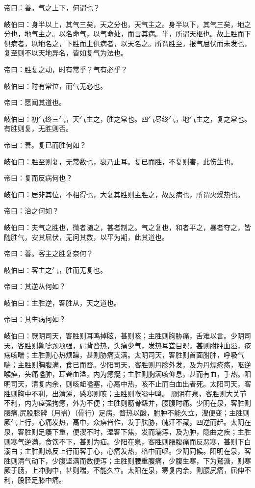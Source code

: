 \documentclass{article}%
\begin{document}
帝曰：善。气之上下，何谓也？

岐伯曰：身半以上，其气三矣，天之分也，天气主之。身半以下，其气三矣，地之分也，地气主之。以名命气，以气命处，而言其病。半，所谓天枢也。故上胜而下俱病者，以地名之，下胜而上俱病者，以天名之。所谓胜至，报气屈伏而未发也，复至则不以天地异名，皆如复气为法也。

帝曰：胜复之动，时有常乎？气有必乎？

岐伯曰：时有常位，而气无必也。

帝曰：愿闻其道也。

岐伯曰：初气终三气，天气主之，胜之常也。四气尽终气，地气主之，复之常也。有胜则复，无胜则否。

帝曰：善。复已而胜何如？

岐伯曰：胜至则复，无常数也，衰乃止耳。复已而胜，不复则害，此伤生也。

帝曰：复而反病何也？

岐伯曰：居非其位，不相得也，大复其胜则主胜之，故反病也，所谓火燥热也。

帝曰：治之何如？

岐伯曰：夫气之胜也，微者随之，甚者制之。气之复也，和者平之，暴者夺之，皆随胜气，安其屈伏，无问其数，以平为期，此其道也。

帝曰：善。客主之胜复奈何？

岐伯曰：客主之气，胜而无复也。

帝曰：其逆从何如？

岐伯曰：主胜逆，客胜从，天之道也。

帝曰：其生病何如？

岐伯曰：厥阴司天，客胜则耳鸣掉眩，甚则咳；主胜则胸胁痛，舌难以言。少阴司天，客胜则鼽嚏颈项强，肩背瞀热，头痛少气，发热耳聋目暝，甚则胕肿血溢，疮疡咳喘；主胜则心热烦躁，甚则胁痛支满。太阴司天，客胜则首面胕肿，呼吸气喘；主胜则胸腹满，食已而瞀。少阳司天，客胜则丹胗外发，及为丹熛疮疡，呕逆喉痹，头痛嗌肿，耳聋血溢，内为瘛瘲；主胜则胸满咳仰息，甚而有血，手热。阳明司天，清复内余，则咳衄嗌塞，心鬲中热，咳不止而白血出者死。太阳司天，客胜则胸中不利，出清涕，感寒则咳；主胜则喉嗌中鸣。 厥阴在泉，客胜则大关节不利，内为痉强拘瘛，外为不便；主胜则筋骨繇并，腰腹时痛。少阴在泉，客胜则腰痛,尻股膝髀（月耑）（骨行）足病，瞀热以酸，胕肿不能久立，溲便变；主胜则厥气上行，心痛发热，鬲中，众痹皆作，发于胠胁，魄汗不藏，四逆而起。太阴在泉，客胜则足痿下重，便溲不时，湿客下焦，发而濡泻，及为肿，隐曲之疾；主胜则寒气逆满，食饮不下，甚则为疝。少阳在泉，客胜则腰腹痛而反恶寒，甚则下白溺白；主胜则热反上行而客于心，心痛发热，格中而呕。少阴同候。阳明在泉，客胜则清气动下，少腹坚满而数便泻；主胜则腰重腹痛，少腹生寒，下为鶩溏，则寒厥于肠，上冲胸中，甚则喘，不能久立。太阳在泉，寒复内余，则腰尻痛，屈伸不利，股胫足膝中痛。
\end{document}
